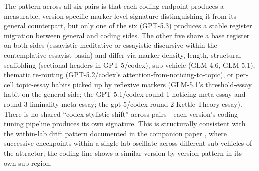 \documentclass[11pt,a4paper]{article}
\begin{document}
The pattern across all six pairs is that each coding endpoint produces a measurable, version-specific marker-level signature distinguishing it from its general counterpart, but only one of the six (GPT-5.3) produces a stable register migration between general and coding sides. The other five share a base register on both sides (essayistic-meditative or essayistic-discursive within the contemplative-essayist basin) and differ via marker density, length, structural scaffolding (sectional headers in GPT-5/codex), sub-vehicle (GLM-4.6, GLM-5.1), thematic re-routing (GPT-5.2/codex's attention-from-noticing-to-topic), or per-cell topic-essay habits picked up by reflexive markers (GLM-5.1's threshold-essay habit on the general side; the GPT-5.1/codex round-1 noticing-meta-essay and round-3 liminality-meta-essay; the gpt-5/codex round-2 Kettle-Theory essay). There is no shared ``codex stylistic shift'' across pairs---each version's coding-tuning pipeline produces its own signature. This is structurally consistent with the within-lab drift pattern documented in the companion paper \citep{tenner2026drift}, where successive checkpoints within a single lab oscillate across different sub-vehicles of the attractor; the coding line shows a similar version-by-version pattern in its own sub-region.
\end{document}
